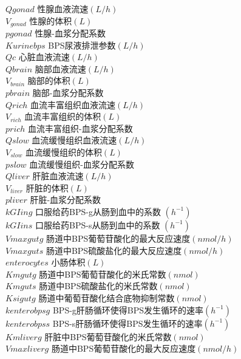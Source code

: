 \documentclass[a4paper,punct=banjiao,twoside]{ctexrep}
\theoremstyle{plain}
\theoremstyle{definition}
\theoremstyle{remark}
\begin{document}
$ Qgonad$ {\hfill  性腺血液流速$(L/h) $}\\
$V_{gonad}$ {\hfill  性腺的体积$(L)$}\\
$ pgonad$ {\hfill  性腺-血浆分配系数}\\
$ Kurinebps $ {\hfill  BPS尿液排泄参数$(L/h)$}\\
$ Qc$ {\hfill  心脏血液流速$(L/h)$}\\
$ Qbrain$ {\hfill  脑部血液流速$(L/h) $}\\
$V_{brain}$ {\hfill  脑部的体积$(L)$}\\
$ pbrain$ {\hfill  脑部-血浆分配系数}\\
$ Qrich$ {\hfill  血流丰富组织血液流速$(L/h) $}\\
$V_{rich}$ {\hfill  血流丰富组织的体积$(L)$}\\
$ prich$ {\hfill  血流丰富组织-血浆分配系数}\\
$ Qslow$ {\hfill  血流缓慢组织血液流速$(L/h) $}\\
$V_{slow}$ {\hfill  血流缓慢组织的体积$(L)$}\\
$ pslow$ {\hfill  血流缓慢组织-血浆分配系数}\\
$ Qliver$ {\hfill  肝脏血液流速$(L/h) $}\\
$V_{liver}$ {\hfill  肝脏的体积$(L)$}\\
$ pliver$ {\hfill  肝脏-血浆分配系数}\\
$kGIing$ {\hfill 口服给药BPS-g从肠到血中的系数 $(h^{-1})$}\\
$kGIins $ {\hfill  口服给药BPS-s从肠到血中的系数 $(h^{-1})$}\\
$Vmaxgutg$ {\hfill  肠道中BPS葡萄苷酸化的最大反应速度$(nmol/h)$}\\
$Vmaxguts$ {\hfill  肠道中BPS硫酸盐化的最大反应速度$(nmol/h)$}\\
$enterocytes $ {\hfill  小肠体积$(L)$}\\
$ Kmgutg$ {\hfill  肠道中BPS葡萄苷酸化的米氏常数$(nmol)$}\\
$ Kmguts$ {\hfill  肠道中BPS硫酸盐化的米氏常数$(nmol)$}\\
$ Ksigutg$ {\hfill  肠道中葡萄苷酸化结合底物抑制常数$(nmol)$}\\
$ kenterobpsg$ {\hfill  BPS-g肝肠循环使得BPS发生循环的速率$(h^{-1})$}\\
$ kenterobpss$ {\hfill  BPS-s肝肠循环使得BPS发生循环的速率$(h^{-1})$}\\
$ Kmliverg$ {\hfill  肝脏中BPS葡萄苷酸化的米氏常数$(nmol)$}\\
$Vmaxliverg$ {\hfill  肠道中BPS葡萄苷酸化的最大反应速度$(nmol/h)$}\\
\end{document}
